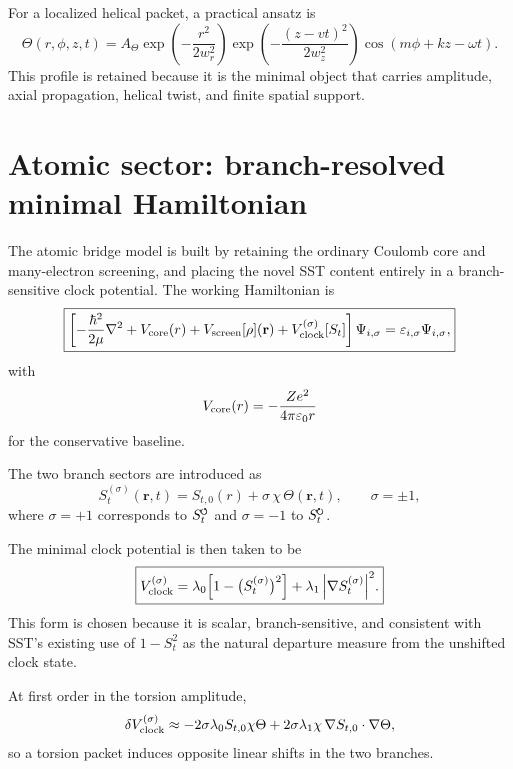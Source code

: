 \documentclass[11pt,a4paper]{article}
\newcommand{\swirlarrow}{\mathchoice{\mkern-2mu\scriptstyle\boldsymbol{\circlearrowleft}}{\mkern-2mu\scriptstyle\boldsymbol{\circlearrowleft}}{\mkern-2mu\scriptscriptstyle\boldsymbol{\circlearrowleft}}{\mkern-2mu\scriptscriptstyle\boldsymbol{\circlearrowleft}}}
\newcommand{\swirlarrowcw}{\mathchoice{\mkern-2mu\scriptstyle\boldsymbol{\circlearrowright}}{\mkern-2mu\scriptstyle\boldsymbol{\circlearrowright}}{\mkern-2mu\scriptscriptstyle\boldsymbol{\circlearrowright}}{\mkern-2mu\scriptscriptstyle\boldsymbol{\circlearrowright}}}
\newcommand{\SwirlClock}{S_t^{\swirlarrow}}
\newcommand{\SwirlClockcw}{S_t^{\swirlarrowcw}}
\begin{document}
For a localized helical packet, a practical ansatz is
\begin{equation}
\label{eq:ThetaPacket}
\Theta(r,\phi,z,t)
=
A_\Theta
\exp\!\left(-\frac{r^2}{2w_r^2}\right)
\exp\!\left(-\frac{(z-vt)^2}{2w_z^2}\right)
\cos\!\left(m\phi+kz-\omega t\right).
\end{equation}
This profile is retained because it is the minimal object that carries amplitude, axial propagation, helical twist, and finite spatial support.

\section{Atomic sector: branch-resolved minimal Hamiltonian}
The atomic bridge model is built by retaining the ordinary Coulomb core and many-electron screening, and placing the novel SST content entirely in a branch-sensitive clock potential. The working Hamiltonian is
\begin{equation}
\label{eq:master-H}
\boxed{
\left[
-\frac{\hbar^2}{2\mu}\nabla^2
+V_{\rm core}(r)
+V_{\rm screen}[\rho](\mathbf r)
+V_{\rm clock}^{(\sigma)}[S_t]
\right]\Psi_{i,\sigma}
=\varepsilon_{i,\sigma}\Psi_{i,\sigma},
}
\end{equation}
with
\begin{equation}
\label{eq:Vcore}
V_{\rm core}(r)=-\frac{Ze^2}{4\pi\varepsilon_0 r}
\end{equation}
for the conservative baseline.

The two branch sectors are introduced as
\begin{equation}
\label{eq:StBranches}
S_t^{(\sigma)}(\mathbf r,t)=S_{t,0}(r)+\sigma\,\chi\,\Theta(\mathbf r,t),
\qquad
\sigma=\pm 1,
\end{equation}
where $\sigma=+1$ corresponds to $\SwirlClock$ and $\sigma=-1$ to $\SwirlClockcw$.

The minimal clock potential is then taken to be
\begin{equation}
\label{eq:Vclock}
\boxed{
V_{\rm clock}^{(\sigma)}
=
\lambda_0\Bigl[1-\bigl(S_t^{(\sigma)}\bigr)^2\Bigr]
+\lambda_1\,\abs{\nabla S_t^{(\sigma)}}^2.
}
\end{equation}
This form is chosen because it is scalar, branch-sensitive, and consistent with SST's existing use of $1-S_t^2$ as the natural departure measure from the unshifted clock state.

At first order in the torsion amplitude,
\begin{equation}
\label{eq:Vclock-linear}
\delta V_{\rm clock}^{(\sigma)}
\approx
-2\sigma\lambda_0 S_{t,0}\chi\Theta
+2\sigma\lambda_1\chi\,\nabla S_{t,0}\cdot \nabla\Theta,
\end{equation}
so a torsion packet induces opposite linear shifts in the two branches.
\end{document}
